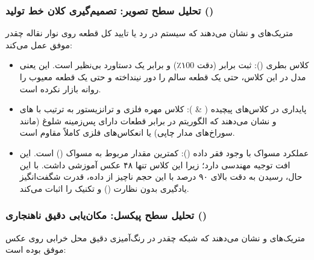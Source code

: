 \documentclass{article}
\begin{document}
\subsubsection{تحلیل سطح تصویر: تصمیم‌گیری کلان خط تولید ()}

متریک‌های  و  نشان می‌دهند که سیستم در رد یا تایید کل قطعه روی نوار نقاله چقدر موفق عمل می‌کند:

\begin{itemize}
	\item کلاس بطری (): ثبت  برابر  (دقت ۱00٪) و  برابر  یک دستاورد بی‌نظیر است. این یعنی مدل در این کلاس، حتی یک قطعه سالم را دور نینداخته و حتی یک قطعه معیوب را روانه بازار نکرده است. 
	
	
	\item پایداری در کلاس‌های پیچیده ( \& ): کلاس مهره فلزی و ترانزیستور به ترتیب با های  و  نشان می‌دهند که الگوریتم در برابر قطعات دارای پس‌زمینه شلوغ (مانند سوراخ‌های مدار چاپی) یا انعکاس‌های فلزی کاملاً مقاوم است.
	
	\item عملکرد مسواک با وجود فقر داده (): کمترین مقدار  مربوط به مسواک () است. این افت توجیه مهندسی دارد؛ زیرا این کلاس تنها ۴۸ عکس آموزشی داشت. با این حال، رسیدن به دقت بالای ۹۰ درصد با این حجم ناچیز از داده، قدرت شگفت‌انگیز یادگیری بدون نظارت () و تکنیک  را اثبات می‌کند.
\end{itemize}

\subsubsection{تحلیل سطح پیکسل: مکان‌یابی دقیق ناهنجاری ()}

متریک‌های  و  نشان می‌دهند که شبکه چقدر در رنگ‌آمیزی دقیق محل خرابی روی عکس موفق بوده است:
\end{document}
